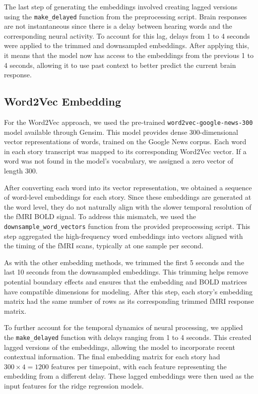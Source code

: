 \documentclass[11pt,letterpaper]{article}
\begin{document}
The last step of generating the embeddings involved creating lagged versions using the \texttt{make\_delayed} function from the preprocessing script. Brain responses are not instantaneous since there is a delay between hearing words and the corresponding neural activity. To account for this lag, delays from 1 to 4 seconds were applied to the trimmed and downsampled embeddings. After applying this, it means that the model now has access to the embeddings from the previous 1 to 4 seconds, allowing it to use past context to better predict the current brain response.

\vspace{1em} %
\subsection{Word2Vec Embedding}
\vspace{0.5em} %
For the Word2Vec approach, we used the pre-trained \texttt{word2vec-google-news-300} model available through Gensim. This model provides dense 300-dimensional vector representations of words, trained on the Google News corpus. Each word in each story transcript was mapped to its corresponding Word2Vec vector. If a word was not found in the model’s vocabulary, we assigned a zero vector of length 300.

After converting each word into its vector representation, we obtained a sequence of word-level embeddings for each story. Since these embeddings are generated at the word level, they do not naturally align with the slower temporal resolution of the fMRI BOLD signal. To address this mismatch, we used the \texttt{downsample\_word\_vectors} function from the provided preprocessing script. This step aggregated the high-frequency word embeddings into vectors aligned with the timing of the fMRI scans, typically at one sample per second.

As with the other embedding methods, we trimmed the first 5 seconds and the last 10 seconds from the downsampled embeddings. This trimming helps remove potential boundary effects and ensures that the embedding and BOLD matrices have compatible dimensions for modeling. After this step, each story’s embedding matrix had the same number of rows as its corresponding trimmed fMRI response matrix.

To further account for the temporal dynamics of neural processing, we applied the \texttt{make\_delayed} function with delays ranging from 1 to 4 seconds. This created lagged versions of the embeddings, allowing the model to incorporate recent contextual information. The final embedding matrix for each story had $300 \times 4 = 1200$ features per timepoint, with each feature representing the embedding from a different delay. These lagged embeddings were then used as the input features for the ridge regression models.
\end{document}
